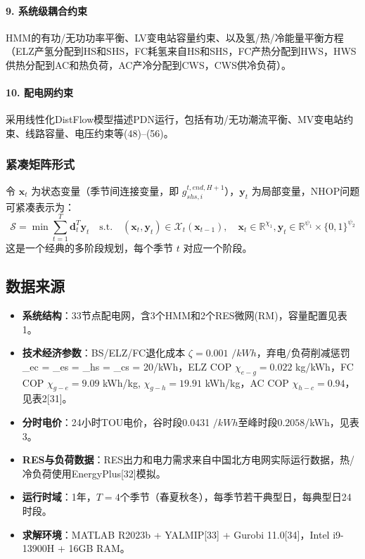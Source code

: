 \documentclass[11pt]{ctexart}
\begin{document}
\paragraph{9. 系统级耦合约束}
HMM的有功/无功功率平衡、LV变电站容量约束、以及氢/热/冷能量平衡方程（ELZ产氢分配到HS和SHS，FC耗氢来自HS和SHS，FC产热分配到HWS，HWS供热分配到AC和热负荷，AC产冷分配到CWS，CWS供冷负荷）。

\paragraph{10. 配电网约束}
采用线性化DistFlow模型描述PDN运行，包括有功/无功潮流平衡、MV变电站约束、线路容量、电压约束等(48)--(56)。

\subsubsection{紧凑矩阵形式}
令 $\boldsymbol{x}_t$ 为状态变量（季节间连接变量，即 $g_{shs,i}^{t,end,H+1}$），$\boldsymbol{y}_t$ 为局部变量，NHOP问题可紧凑表示为：
\begin{equation}
    \mathcal{S} = \min \sum_{t=1}^{T} \boldsymbol{d}_t^T \boldsymbol{y}_t \quad \text{s.t.} \quad (\boldsymbol{x}_t, \boldsymbol{y}_t) \in \mathcal{X}_t(\boldsymbol{x}_{t-1}), \quad \boldsymbol{x}_t \in \mathbb{R}^{\chi_1}, \boldsymbol{y}_t \in \mathbb{R}^{\psi_1} \times \{0,1\}^{\psi_2}
\end{equation}
这是一个经典的多阶段规划，每个季节 $t$ 对应一个阶段。

\subsection{数据来源}

\begin{itemize}[leftmargin=2em]
    \item \textbf{系统结构}：33节点配电网，含3个HMM和2个RES微网(RM)，容量配置见表1。
    \item \textbf{技术经济参数}：BS/ELZ/FC退化成本 $\zeta = 0.001$ $/kWh，弃电/负荷削减惩罚 $\varpi_{ec} = \iota_{es} = \iota_{hs} = \iota_{cs} = 20$ $/kWh，ELZ COP $\chi_{e-g} = 0.022$ kg/kWh，FC COP $\chi_{g-e} = 9.09$ kWh/kg, $\chi_{g-h} = 19.91$ kWh/kg，AC COP $\chi_{h-c} = 0.94$，见表2[31]。
    \item \textbf{分时电价}：24小时TOU电价，谷时段0.0431 $/kWh至峰时段0.2058 $/kWh，见表3。
    \item \textbf{RES与负荷数据}：RES出力和电力需求来自中国北方电网实际运行数据，热/冷负荷使用EnergyPlus[32]模拟。
    \item \textbf{运行时域}：1年，$T=4$个季节（春夏秋冬），每季节若干典型日，每典型日24时段。
    \item \textbf{求解环境}：MATLAB R2023b + YALMIP[33] + Gurobi 11.0[34]，Intel i9-13900H + 16GB RAM。
\end{itemize}
\end{document}
